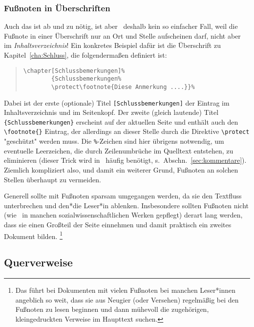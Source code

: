 \subsubsection{Fußnoten in Überschriften}

Auch das ist ab und zu nötig, ist aber \va\ deshalb kein so
einfacher Fall, weil die Fußnote in einer Überschrift nur an Ort
und Stelle aufscheinen darf, nicht aber im \emph{Inhaltsverzeichnis}! Ein
konkretes Beispiel dafür ist die Überschrift zu
Kapitel~\ref{cha:Schluss}, die folgendermaßen definiert ist:
%
\begin{quote}
\begin{verbatim}
\chapter[Schlussbemerkungen]%
        {Schlussbemerkungen%
        \protect\footnote{Diese Anmerkung ....}}%
\end{verbatim}
\end{quote}
%
Dabei ist der erste (optionale) Titel \verb![Schlussbemerkungen]!
der Eintrag im Inhaltsverzeichnis und im Seitenkopf. 
Der zweite (gleich lautende) Titel
\texttt{\{Schlussbemerkungen\}} erscheint auf der aktuellen Seite und
enthält auch den \verb!\footnote{}! Eintrag, der allerdings an
dieser Stelle durch die Direktive \verb!\protect! "geschützt"
werden muss. Die \verb!%!-Zeichen sind hier übrigens notwendig,
um eventuelle Leerzeichen, die durch Zeilenumbrüche im Quelltext
entstehen, zu eliminieren (dieser Trick wird 
in \latex\ häufig benötigt, s.\ Abschn.~\ref{sec:kommentare}). 
Ziemlich kompliziert also, und damit 
ein weiterer Grund, Fußnoten an solchen Stellen überhaupt zu vermeiden.

Generell sollte mit Fußnoten sparsam umgegangen werden, da sie den
Textfluss unterbrechen und den*die Leser*in ablenken. Insbesondere
sollten Fußnoten nicht (wie \va\ in manchen
sozialwissenschaftlichen Werken gepflegt) derart lang werden, dass
sie einen Großteil der Seite einnehmen und damit praktisch ein
zweites Dokument bilden.%
\footnote{Das führt bei Dokumenten mit vielen Fußnoten bei manchen
	Leser*innen angeblich so weit, dass sie aus Neugier (oder Versehen)
	regelmäßig bei den Fußnoten zu lesen beginnen und dann mühevoll die
	zugehörigen, kleingedruckten Verweise im Haupttext suchen.}


\subsection{Querverweise}
\label{sec:querverweise}

